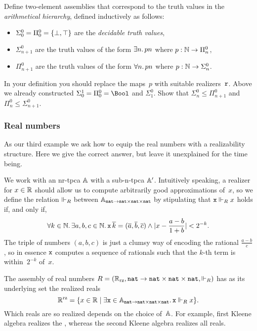 \begin{exercise}
  Define two-element assemblies that correspond to the truth values in the \emph{arithmetical hierarchy}, defined inductively as follows:
  \begin{itemize}
  \item $\Sigma^0_0 = \Pi^0_0 = \set{\bot, \top}$ are the \emph{decidable truth values},
  \item $\Sigma^0_{n+1}$ are the truth values of the form $\some{n} p n$ where $p : \NN \to \Pi^0_n$,
  \item $\Pi^0_{n+1}$ are the truth values of the form $\all{n} p n$ where $p : \NN \to \Sigma^0_n$.
  \end{itemize}
  In your definition you should replace the maps~$p$ with suitable realizers~$\R{r}$.
  Above we already constructed $\Sigma_0^1 = \Pi^0_0 = \Bool$ and $\Sigma^0_1$. Show that $\Sigma^0_n \leq \Pi^0_{n+1}$ and $\Pi^0_n \leq \Sigma^0_{n+1}$.
\end{exercise}


\subsubsection{Real numbers}
\label{sec:asm-real-numbers}

As our third example we ask how to equip the real numbers with a realizability structure. Here we give the correct answer, but leave it unexplained for the time being.

We work with an nr-tpca $\AA$ with a sub-n-tpca $\subAA$. Intuitively speaking, a realizer for $x \in \RR$ should allow us to compute arbitrarily good approximations of~$x$, so we define the relation $\rz[R]$ between $\Atyp{\ttnat \to \ttnat \times \ttnat \times \ttnat}$ by stipulating that $\R{x} \rz[R] x$ holds if, and only if,
%
\begin{equation*}
  \all{k \in \NN} \some{a, b, c \in \NN}
  \R{x} \, \overline{k} = (\overline{a}, \overline{b}, \overline{c})
  \land |x - \frac{a - b}{1 + b}| < 2^{-k}.
\end{equation*}
%
The triple of numbers $(a, b, c)$ is just a clumsy way of encoding the rational $\frac{a - b}{c}$, so in essence $\R{x}$ computes a sequence of rationals such that the $k$-th term is within~$2^{-k}$ of~$x$.

The assembly of real numbers $R = (\RR_{\mathrm{rz}}, \ttnat \to \ttnat \times \ttnat \times \ttnat, {\rz[R]})$ has as its underlying set the realized reals
%
\begin{equation*}
  \RR^{\mathrm{rz}}
  = \set{x \in \RR \such \some{\R{x} \in \Atyp{\ttnat \to \ttnat \times \ttnat \times \ttnat}} \R{x} \rz[R] x}.
\end{equation*}
%
Which reals are so realized depends on the choice of~$\AA$. For example, first Kleene algebra realizes the , whereas the second Kleene algebra realizes all reals.


